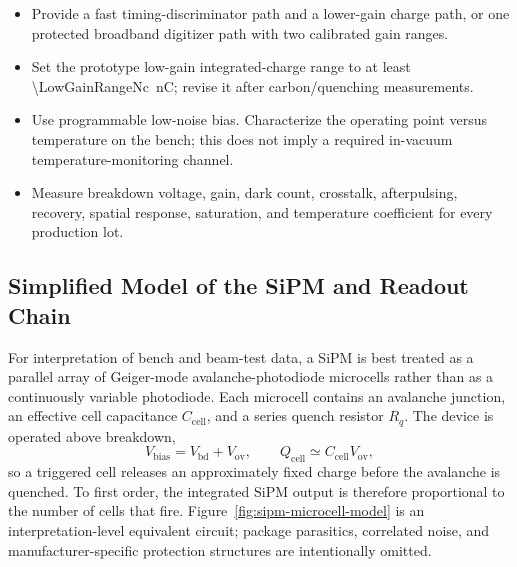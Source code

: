 \documentclass[10pt,letterpaper]{article}
\begin{document}
\begin{itemize}
  \item Provide a fast timing-discriminator path and a lower-gain charge path, or one
    protected broadband digitizer path with two calibrated gain ranges.
  \item Set the prototype low-gain integrated-charge range to at least
    \SI{\LowGainRangeNc}{\nano\coulomb}; revise it after carbon/quenching measurements.
  \item Use programmable low-noise bias. Characterize the operating point versus temperature
    on the bench; this does not imply a required in-vacuum temperature-monitoring channel.
  \item Measure breakdown voltage, gain, dark count, crosstalk, afterpulsing, recovery,
    spatial response, saturation, and temperature coefficient for every production lot.
\end{itemize}

\subsection{Simplified Model of the SiPM and Readout Chain}

For interpretation of bench and beam-test data, a SiPM is best treated as a parallel array
of Geiger-mode avalanche-photodiode microcells rather than as a continuously variable
photodiode. Each microcell contains an avalanche junction, an effective cell capacitance
$C_{\mathrm{cell}}$, and a series quench resistor $R_q$. The device is operated above
breakdown,
\begin{equation}
  V_{\mathrm{bias}} = V_{\mathrm{bd}} + V_{\mathrm{ov}},
  \qquad
  Q_{\mathrm{cell}} \simeq C_{\mathrm{cell}} V_{\mathrm{ov}},
  \label{eq:sipm-cell-charge}
\end{equation}
so a triggered cell releases an approximately fixed charge before the avalanche is
quenched. To first order, the integrated SiPM output is therefore proportional to the
number of cells that fire. Figure~\ref{fig:sipm-microcell-model} is an interpretation-level
equivalent circuit; package parasitics, correlated noise, and manufacturer-specific
protection structures are intentionally omitted.
\end{document}
